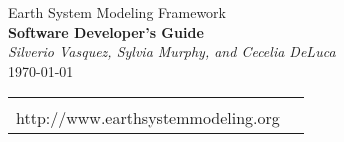 \documentclass[english,dvips]{article}
\begin{document}

\begin{titlepage}

\begin{center}
{\Large    Earth System Modeling Framework } \\
{\Large {\bf  Software Developer's Guide}} \\
\medskip
{\it Silverio Vasquez, Sylvia Murphy, and Cecelia DeLuca} \\
\vspace{.5in}
{\large \today}
\end{center}

\begin{latexonly}
\vspace{6in}
\begin{tabular}{p{5in}p{.9in}}
\hrulefill \\
\noindent http://www.earthsystemmodeling.org \\
\end{tabular}
\end{latexonly}

\end{titlepage}

\tableofcontents

\newpage












\end{document}
